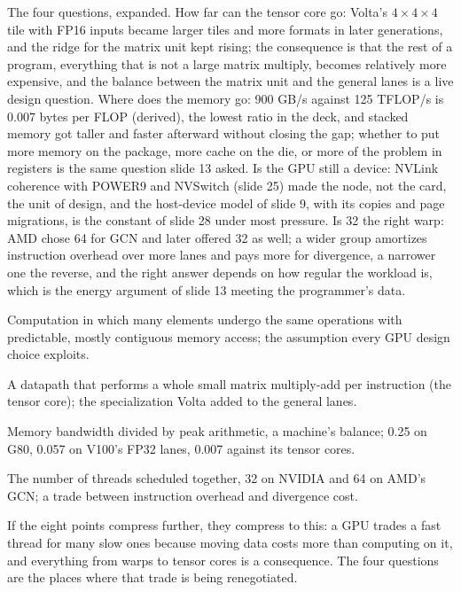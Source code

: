 \documentclass[11pt,letterpaper]{article}
\newenvironment{terms}{\begin{tcolorbox}[termsbox]\begin{description}[leftmargin=1.1em,itemsep=3pt,topsep=2pt,font=\normalfont]}{\end{description}\end{tcolorbox}}
\newcommand{\term}[2]{\item[\textbf{#1}]\index{#1} #2}
\newenvironment{intuition}{\begin{tcolorbox}[intuitionbox]}{\end{tcolorbox}}
\begin{document}
The four questions, expanded. How far can the tensor core go: Volta's $4 \times 4 \times 4$ tile with FP16 inputs became larger tiles and more formats in later generations, and the ridge for the matrix unit kept rising; the consequence is that the rest of a program, everything that is not a large matrix multiply, becomes relatively more expensive, and the balance between the matrix unit and the general lanes is a live design question. Where does the memory go: 900 GB/s against 125 TFLOP/s is 0.007 bytes per FLOP (derived), the lowest ratio in the deck, and stacked memory got taller and faster afterward without closing the gap; whether to put more memory on the package, more cache on the die, or more of the problem in registers is the same question slide 13 asked. Is the GPU still a device: NVLink coherence with POWER9 and NVSwitch (slide 25) made the node, not the card, the unit of design, and the host-device model of slide 9, with its copies and page migrations, is the constant of slide 28 under most pressure. Is 32 the right warp: AMD chose 64 for GCN and later offered 32 as well; a wider group amortizes instruction overhead over more lanes and pays more for divergence, a narrower one the reverse, and the right answer depends on how regular the workload is, which is the energy argument of slide 13 meeting the programmer's data.

\begin{terms}
\term{regular work}{Computation in which many elements undergo the same operations with predictable, mostly contiguous memory access; the assumption every GPU design choice exploits.}
\term{matrix engine}{A datapath that performs a whole small matrix multiply-add per instruction (the tensor core); the specialization Volta added to the general lanes.}
\term{bytes per FLOP}{Memory bandwidth divided by peak arithmetic, a machine's balance; 0.25 on G80, 0.057 on V100's FP32 lanes, 0.007 against its tensor cores.}
\term{warp width}{The number of threads scheduled together, 32 on NVIDIA and 64 on AMD's GCN; a trade between instruction overhead and divergence cost.}
\end{terms}

\begin{intuition}
If the eight points compress further, they compress to this: a GPU trades a fast thread for many slow ones because moving data costs more than computing on it, and everything from warps to tensor cores is a consequence. The four questions are the places where that trade is being renegotiated.
\end{intuition}
\end{document}

